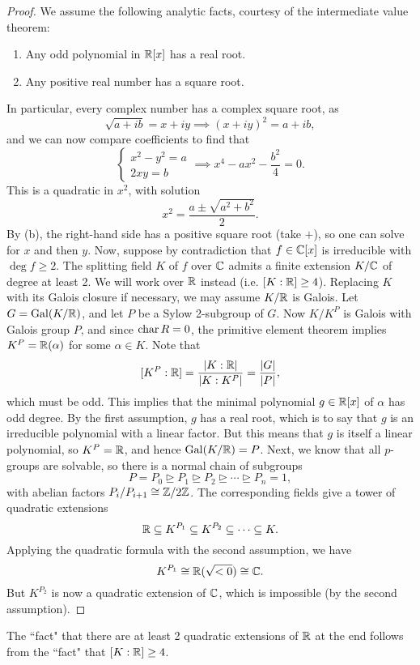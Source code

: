 \begin{proof}
    We assume the following analytic facts, courtesy of the intermediate value theorem:
    \begin{enumerate}[label=(\alph*)]
        \item Any odd polynomial in $\mathbb{{R}}[x]$ has a real root.
        \item Any positive real number has a square root.
    \end{enumerate}
    In particular, every complex number has a complex square root, as
    \[
        \sqrt{a + ib} = x + iy \implies (x + iy)^2 = a + ib,
    \]
    and we can now compare coefficients to find that
    \[
        \begin{cases}
            x^2 - y^2 = a \\
            2xy = b
        \end{cases}
        \implies x^4 - ax^2 - \frac{b^2}{4} = 0.
    \]
    This is a quadratic in $x^2$, with solution
    \[
        x^2 = \frac{a \pm \sqrt{a^2 + b^2}}{2}.
    \]
    By (b), the right-hand side has a positive square root (take $+$), so one can solve for $x$ and then $y$. Now, suppose by contradiction that $f \in \mathbb{{C}}[x]$ is irreducible with $\deg{f} \geq 2$. The splitting field $K$ of $f$ over $\mathbb{{C}}$ admits a finite extension $K/\mathbb{{C}}$ of degree at least 2. We will work over $\mathbb{{R}}$ instead (i.e. $[K : \mathbb{{R}}] \geq 4$). Replacing $K$ with its Galois closure if necessary, we may assume $K/\mathbb{{R}}$ is Galois. Let $G = \operatorname{Gal}(K/\mathbb{{R}})$, and let $P$ be a Sylow 2-subgroup of $G$. Now $K/K^P$ is Galois with Galois group $P$, and since $\operatorname{char}{{R}} = 0$, the primitive element theorem implies $K^P = \mathbb{{R}}(\alpha)$ for some $\alpha \in K$. Note that
    \[
        [K^P : \mathbb{{R}}] = \frac{|K : \mathbb{{R}}|}{|K : K^P|} = \frac{|G|}{|P|},
    \]
    which must be odd. This implies that the minimal polynomial $g \in \mathbb{{R}}[x]$ of $\alpha$ has odd degree. By the first assumption, $g$ has a real root, which is to say that $g$ is an irreducible polynomial with a linear factor. But this means that $g$ is itself a linear polynomial, so $K^P = \mathbb{{R}}$, and hence $\operatorname{Gal}(K/\mathbb{{R}}) = P$. Next, we know that all $p$-groups are solvable, so there is a normal chain of subgroups
    \[
        P = P_0 \unrhd P_1 \unrhd P_2 \unrhd \cdots \unrhd P_n = 1,
    \]
    with abelian factors $P_i/P_{i + 1} \cong \mathbb{{Z}}/{{2}}\mathbb{{Z}}$. The corresponding fields give a tower of quadratic extensions
    \[
        \mathbb{{R}} \subseteq K^{P_1} \subseteq K^{P_2} \subseteq \cdots \subseteq K.
    \]
    Applying the quadratic formula with the second assumption, we have
    \[
        K^{P_1} \cong \mathbb{{R}}(\sqrt{< 0}) \cong \mathbb{{C}}.
    \]
    But $K^{P_2}$ is now a quadratic extension of $\mathbb{{C}}$, which is impossible (by the second assumption).
\end{proof}

\begin{remark}
    The ``fact" that there are at least 2 quadratic extensions of $\mathbb{{R}}$ at the end follows from the ``fact" that $[K : \mathbb{{R}}] \geq 4$.
\end{remark}
